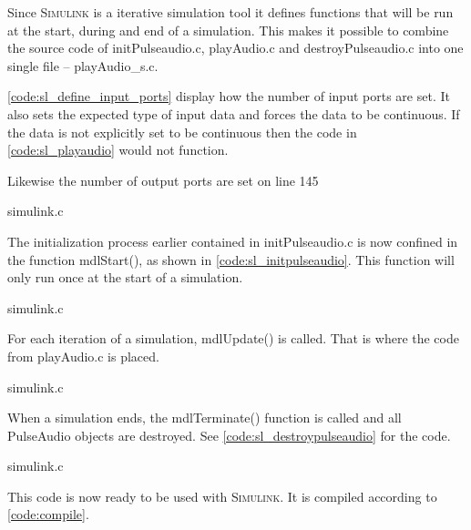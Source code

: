 \documentclass[journal]{IEEEtran}
\begin{document}
Since \textsc{Simulink} is a iterative simulation tool it defines functions that will be run at the start, during and end of a simulation. This makes it possible to combine the source code of initPulseaudio.c, playAudio.c and destroyPulseaudio.c into one single file -- playAudio\_s.c.

\autoref*{code:sl_define_input_ports} display how the number of input ports are set. It also sets the expected type of input data and forces the data to be continuous. If the data is not explicitly set to be continuous then the code in \autoref*{code:sl_playaudio} would not function.

Likewise the number of output ports are set on line 145


{simulink.c}

The initialization process earlier contained in initPulseaudio.c is now confined in the function mdlStart(), as shown in \autoref*{code:sl_initpulseaudio}. This function will only run once at the start of a simulation.


{simulink.c}

For each iteration of a simulation, mdlUpdate() is called. That is where the code from playAudio.c is placed.


{simulink.c}

When a simulation ends, the mdlTerminate() function is called and all PulseAudio objects are destroyed. See \autoref*{code:sl_destroypulseaudio} for the code.


{simulink.c}

This code is now ready to be used with \textsc{Simulink}. It is compiled according to \autoref*{code:compile}.
\end{document}
